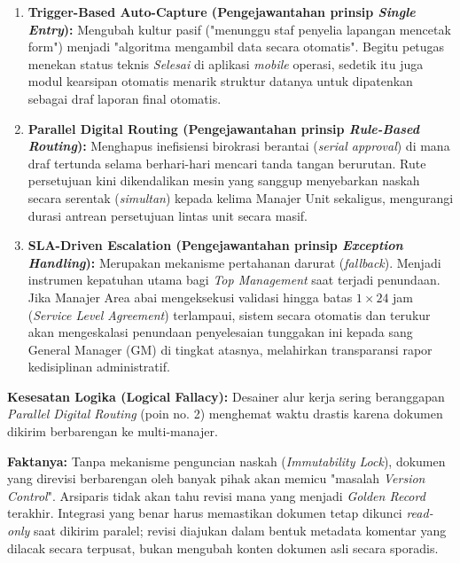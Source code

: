 \documentclass[12pt,a4paper]{report}
\begin{document}
\begin{enumerate}[leftmargin=*]
    \item \textbf{Trigger-Based Auto-Capture (Pengejawantahan prinsip \textit{Single Entry}):} Mengubah kultur pasif ("menunggu staf penyelia lapangan mencetak form") menjadi "algoritma mengambil data secara otomatis". Begitu petugas menekan status teknis \textit{Selesai} di aplikasi \textit{mobile} operasi, sedetik itu juga modul kearsipan otomatis menarik struktur datanya untuk dipatenkan sebagai draf laporan final otomatis.
    \item \textbf{Parallel Digital Routing (Pengejawantahan prinsip \textit{Rule-Based Routing}):} Menghapus inefisiensi birokrasi berantai (\textit{serial approval}) di mana draf tertunda selama berhari-hari mencari tanda tangan berurutan. Rute persetujuan kini dikendalikan mesin yang sanggup menyebarkan naskah secara serentak (\textit{simultan}) kepada kelima Manajer Unit sekaligus, mengurangi durasi antrean persetujuan lintas unit secara masif.
    \item \textbf{SLA-Driven Escalation (Pengejawantahan prinsip \textit{Exception Handling}):} Merupakan mekanisme pertahanan darurat (\textit{fallback}). Menjadi instrumen kepatuhan utama bagi \textit{Top Management} saat terjadi penundaan. Jika Manajer Area abai mengeksekusi validasi hingga batas $1 \times 24$ jam (\textit{Service Level Agreement}) terlampaui, sistem secara otomatis dan terukur akan mengeskalasi penundaan penyelesaian tunggakan ini kepada sang General Manager (GM) di tingkat atasnya, melahirkan transparansi rapor kedisiplinan administratif.
\end{enumerate}

\begin{plnbox}
\small
\textbf{Kesesatan Logika (Logical Fallacy):} Desainer alur kerja sering beranggapan \textit{Parallel Digital Routing} (poin no. 2) menghemat waktu drastis karena dokumen dikirim berbarengan ke multi-manajer. 

\textbf{Faktanya:} Tanpa mekanisme penguncian naskah (\textit{Immutability Lock}), dokumen yang direvisi berbarengan oleh banyak pihak akan memicu "masalah \textit{Version Control}". Arsiparis tidak akan tahu revisi mana yang menjadi \textit{Golden Record} terakhir. Integrasi yang benar harus memastikan dokumen tetap dikunci \textit{read-only} saat dikirim paralel; revisi diajukan dalam bentuk metadata komentar yang dilacak secara terpusat, bukan mengubah konten dokumen asli secara sporadis.
\end{plnbox}
\end{document}
